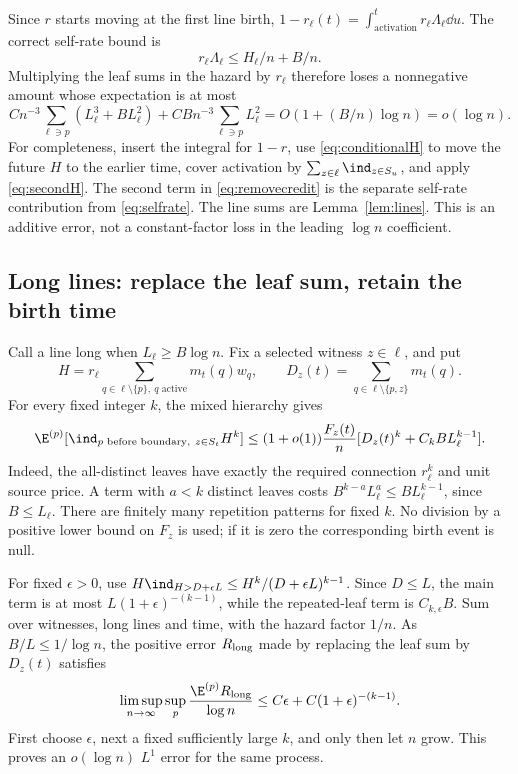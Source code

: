 Since \(r\) starts moving at the first line birth,
\(1-r_\ell(t)=\int_{\text{activation}}^t r_\ell\Lambda_\ell\dd u\).
The correct self-rate bound is
\begin{equation}\label{eq:selfrate}
 r_\ell\Lambda_\ell\le H_\ell/n+B/n.
\end{equation}
Multiplying the leaf sums in the hazard by \(r_\ell\) therefore loses
a nonnegative amount whose expectation is at most
\begin{equation}\label{eq:removecredit}
 Cn^{-3}\sum_{\ell\ni p}(L_\ell^3+BL_\ell^2)
 +CBn^{-3}\sum_{\ell\ni p}L_\ell^2
 =O(1+(B/n)\log n)=o(\log n).
\end{equation}
For completeness, insert the integral for \(1-r\), use
\eqref{eq:conditionalH} to move the future \(H\) to the earlier
time, cover activation by \(\sum_{z\in\ell}\ind_{z\in S_u}\),
and apply \eqref{eq:secondH}. The second term in
\eqref{eq:removecredit} is the separate self-rate contribution from
\eqref{eq:selfrate}. The line sums are Lemma~\ref{lem:lines}.
This is an additive error, not a constant-factor loss in the leading
\(\log n\) coefficient.

\subsection{Long lines: replace the leaf sum, retain the birth time}
Call a line long when \(L_\ell\ge B\log n\). Fix a selected witness
\(z\in\ell\), and put
\[
 H=r_\ell\sum_{q\in\ell\setminus\{p\},\ q\text{ active}}m_t(q)w_q,
 \qquad D_z(t)=\sum_{q\in\ell\setminus\{p,z\}}m_t(q).
\]
For every fixed integer \(k\), the mixed hierarchy gives
\begin{equation}\label{eq:longmoment}
 \E^{(p)}[\ind_{p\text{ before boundary},\ z\in S_t}H^k]
 \le(1+o(1))\frac{F_z(t)}n
       [D_z(t)^k+C_kB L_\ell^{k-1}].
\end{equation}
Indeed, the all-distinct leaves have exactly the required connection
\(r_\ell^k\) and unit source price. A term with \(a<k\) distinct
leaves costs \(B^{k-a}L_\ell^a\le BL_\ell^{k-1}\), since
\(B\le L_\ell\). There are finitely many repetition patterns for
fixed \(k\). No division by a positive lower bound on \(F_z\) is
used; if it is zero the corresponding birth event is null.

For fixed \(\epsilon>0\), use
\(H\ind_{H>D+\epsilon L}\le H^k/(D+\epsilon L)^{k-1}\).
Since \(D\le L\), the main term is at most
\(L(1+\epsilon)^{-(k-1)}\), while the repeated-leaf term is
\(C_{k,\epsilon}B\). Sum over witnesses, long lines and time,
with the hazard factor \(1/n\). As \(B/L\le1/\log n\), the
positive error \(R_{\rm long}\) made by replacing the leaf sum by
\(D_z(t)\) satisfies
\begin{equation}\label{eq:longerror}
 \limsup_{n\to\infty}\sup_p
 \frac{\E^{(p)}R_{\rm long}}{\log n}
 \le C\epsilon+C(1+\epsilon)^{-(k-1)}.
\end{equation}
First choose \(\epsilon\), next a fixed sufficiently large \(k\),
and only then let \(n\) grow. This proves an \(o(\log n)\)
\(L^1\) error for the same process.

